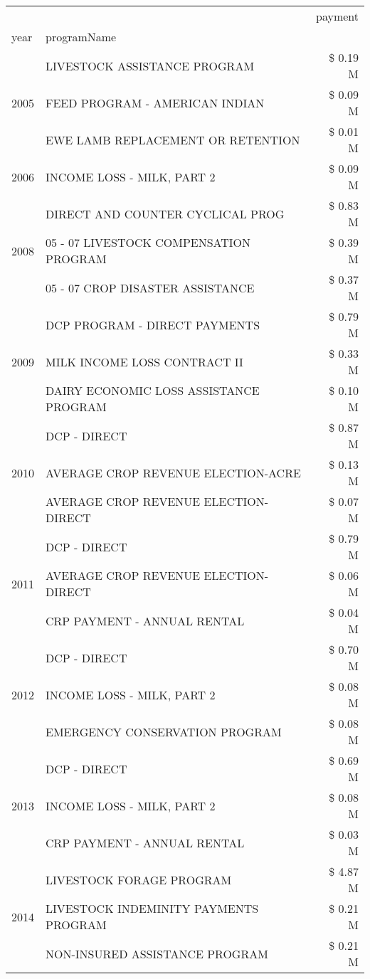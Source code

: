 \begin{tabular}{llr}
\toprule
 &  & payment \\
year & programName &  \\
\midrule
\multirow[t]{3}{*}{2005} & LIVESTOCK ASSISTANCE PROGRAM & \$ 0.19 M \\
 & FEED PROGRAM - AMERICAN INDIAN & \$ 0.09 M \\
 & EWE LAMB REPLACEMENT OR RETENTION & \$ 0.01 M \\
\cline{1-3}
2006 & INCOME LOSS - MILK, PART 2 & \$ 0.09 M \\
\cline{1-3}
\multirow[t]{3}{*}{2008} & DIRECT AND COUNTER CYCLICAL PROG & \$ 0.83 M \\
 & 05 - 07 LIVESTOCK COMPENSATION PROGRAM & \$ 0.39 M \\
 & 05 - 07 CROP DISASTER ASSISTANCE & \$ 0.37 M \\
\cline{1-3}
\multirow[t]{3}{*}{2009} & DCP PROGRAM - DIRECT PAYMENTS & \$ 0.79 M \\
 & MILK INCOME LOSS CONTRACT II & \$ 0.33 M \\
 & DAIRY ECONOMIC LOSS ASSISTANCE PROGRAM & \$ 0.10 M \\
\cline{1-3}
\multirow[t]{3}{*}{2010} & DCP - DIRECT & \$ 0.87 M \\
 & AVERAGE CROP REVENUE ELECTION-ACRE & \$ 0.13 M \\
 & AVERAGE CROP REVENUE ELECTION-DIRECT & \$ 0.07 M \\
\cline{1-3}
\multirow[t]{3}{*}{2011} & DCP - DIRECT & \$ 0.79 M \\
 & AVERAGE CROP REVENUE ELECTION-DIRECT & \$ 0.06 M \\
 & CRP PAYMENT - ANNUAL RENTAL & \$ 0.04 M \\
\cline{1-3}
\multirow[t]{3}{*}{2012} & DCP - DIRECT & \$ 0.70 M \\
 & INCOME LOSS - MILK, PART 2 & \$ 0.08 M \\
 & EMERGENCY CONSERVATION PROGRAM & \$ 0.08 M \\
\cline{1-3}
\multirow[t]{3}{*}{2013} & DCP - DIRECT & \$ 0.69 M \\
 & INCOME LOSS - MILK, PART 2 & \$ 0.08 M \\
 & CRP PAYMENT - ANNUAL RENTAL & \$ 0.03 M \\
\cline{1-3}
\multirow[t]{3}{*}{2014} & LIVESTOCK FORAGE PROGRAM & \$ 4.87 M \\
 & LIVESTOCK INDEMINITY PAYMENTS PROGRAM & \$ 0.21 M \\
 & NON-INSURED ASSISTANCE PROGRAM & \$ 0.21 M \\

\end{tabular}
